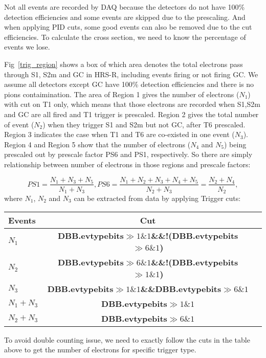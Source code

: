 \documentclass[a4paper,10.5pt]{article}
\begin{document}
  Not all events are recorded by DAQ because the detectors do not have 100\% detection efficiencies and some events are skipped due to the prescaling. And when applying PID cuts, some good events can also be removed due to the cut efficiencies. To calculate the cross section, we need to know the percentage of events we lose.

  Fig~\ref{trig_region} shows a box of which area denotes the total electrons pass through S1, S2m and GC in HRS-R, including events firing or not firing GC. We assume all detectors except GC have 100\% detection efficiencies and there is no pions contaimination. The area of Region 1 gives the number of electrons ($N_{1}$) with cut on T1 only, which means that those electrons are recorded when S1,S2m and GC are all fired and T1 trigger is prescaled. Region 2 gives the total number of event ($N_{2}$) when they trigger S1 and S2m but not GC, after T6 prescaled. Region 3 indicates the case when T1 and T6 are co-existed in one event ($N_{3}$). Region 4 and Region 5 show that the number of electrons ($N_{4}$ and $N_{5}$) being prescaled out by prescale factor PS6 and PS1, respectively. So there are simply relationship between number of electrons in those regions and prescale factors:

 \begin{equation}
 PS1 = \frac{N_{1}+N_{3}+N_{5}}{N_{1}+N_{3}},  PS6 = \frac{N_{1}+N_{2}+N_{3}+N_{4}+N_{5}}{N_{2}+N_{3}}=\frac{N_{2}+N_{4}}{N_{2}},
\end{equation}
 where $N_{1}$, $N_{2}$ and $N_{3}$ can be extracted from data by applying Trigger cuts:

\begin{table}[htbp]
 \begin{tabular}{lcc}
\toprule
 Events  &  Cut\\
\midrule
$N_{1}$  &  \textbf{DBB.evtypebits$\gg1\&1$\&\&!(DBB.evtypebits$\gg6\&1$)} \\
$N_{2}$  &  \textbf{DBB.evtypebits$\gg6\&1$\&\&!(DBB.evtypebits$\gg1\&1$)} \\
$N_{3}$  &  \textbf{DBB.evtypebits$\gg1\&1$\&\&DBB.evtypebits$\gg6\&1$}  \\
$N_{1}+N_{3}$  &  \textbf{DBB.evtypebits$\gg1\&1$}  \\
$N_{2}+N_{3}$  &  \textbf{DBB.evtypebits$\gg6\&1$}  \\
\bottomrule
  \end{tabular}
\end{table}
To avoid double counting issue, we need to exactly follow the cuts in the table above to get the number of electrons for specific trigger type.
\end{document}
